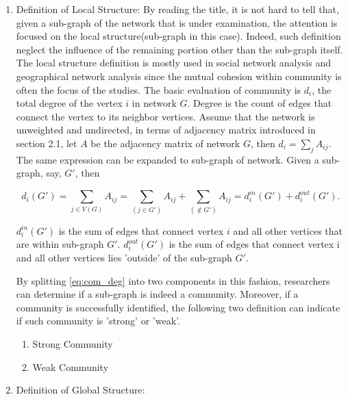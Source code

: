 \documentclass[12pt]{article}
\begin{document}
\begin{enumerate}[label=(\roman*)]
\item Definition of Local Structure: By reading the title, it is not hard to tell that, given a sub-graph of the network that is under examination, the attention is focused on the local structure(sub-graph in this case). Indeed, such definition neglect the influence of the remaining portion other than the sub-graph itself. The local structure definition is mostly used in social network analysis \cite{17} and geographical network analysis \cite{18} since the mutual cohesion within community is often the focus of the studies. The basic evaluation of community is $d_i$, the total degree of the vertex $i$ in network $G$. Degree is the count of edges that connect the vertex to its neighbor vertices. Assume that the network is unweighted and undirected, in terms of adjacency matrix introduced in section 2.1, let $A$ be the adjacency matrix of network $G$, then $d_i = \sum_{j} A_{ij}$. The same expression can be expanded to sub-graph of network. Given a sub-graph, say, $G'$, then 

\begin{equation}\label{eq:com_deg}
d_i(G') = \sum_{j \in V(G)} A_{ij} = \sum_{(j\in G')} A_{ij} + \sum_{(\notin G')} A_{ij} = d_i^{in}(G') + d_i^{out}(G').
\end{equation}

$d_i^{in}(G')$ is the sum of edges that connect vertex $i$ and all other vertices that are within sub-graph $G'$. $d_i^{out}(G')$ is the sum of edges that connect vertex i and all other vertices lies 'outside' of the sub-graph $G'$. 
 
\bigbreak
 
By splitting \eqref{eq:com_deg} into two components in this fashion, researchers can determine if a sub-graph is indeed a community. Moreover, if a community is successfully identified, the following two definition can indicate if such community is 'strong' or 'weak'.

\begin{enumerate}
    \item Strong Community
    \item Weak Community
\end{enumerate}
 
\item Definition of Global Structure:
\end{enumerate}
\end{document}
